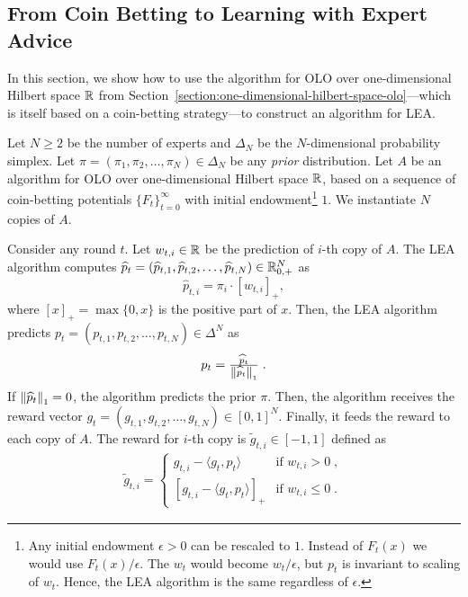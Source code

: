 \subsection{From Coin Betting to Learning with Expert Advice}
\label{section:reduction-experts}

In this section, we show how to use the algorithm for OLO over one-dimensional
Hilbert space $\mathbb{R}$ from
Section~\ref{section:one-dimensional-hilbert-space-olo}---which is itself based
on a coin-betting strategy---to construct an algorithm for \ac{LEA}.

Let $N \ge 2$ be the number of experts and $\Delta_N$ be the $N$-dimensional
probability simplex. Let $\pi = (\pi_1, \pi_2, \dots, \pi_N) \in \Delta_N$ be
any \emph{prior} distribution. Let $A$ be an algorithm for OLO over
one-dimensional Hilbert space $\mathbb{R}$, based on a sequence of coin-betting
potentials $\{F_t\}_{t=0}^\infty$ with initial endowment\footnote{Any initial
endowment $\epsilon > 0$ can be rescaled to $1$. Instead of $F_t(x)$ we would
use $F_t(x)/\epsilon$. The $w_t$ would become $w_t/\epsilon$, but $p_t$ is
invariant to scaling of $w_t$. Hence, the LEA algorithm is the same regardless
of $\epsilon$.} $1$. We instantiate $N$ copies of $A$.

Consider any round $t$. Let $w_{t,i} \in \mathbb{R}$ be the prediction of $i$-th copy of
$A$. The LEA algorithm computes $\widehat p_t = (\widehat p_{t,1}, \widehat
p_{t,2}, \dots, \widehat p_{t,N}) \in \mathbb{R}_{0,+}^N$ as
\begin{equation}
\label{eq:phat}
\widehat p_{t,i} = \pi_i \cdot [w_{t,i}]_+,
\end{equation}
where $[x]_+ = \max\{0,x\}$ is the positive part of $x$. Then, the LEA
algorithm predicts $p_t = (p_{t,1}, p_{t,2}, \dots, p_{t,N}) \in \Delta^N$ as
\begin{equation}
\label{eq:preds_experts}
p_t = \tfrac{\widehat p_t}{\left\|{\widehat p_t}\right\|_1} \; .
\end{equation}
If $\left\|{\widehat p_t}\right\|_1 = 0$, the algorithm predicts the prior $\pi$.
Then, the algorithm receives the reward vector
$g_t = (g_{t,1}, g_{t,2}, \dots, g_{t,N}) \in [0,1]^N$. Finally, it
feeds the reward to each copy of $A$. The reward for $i$-th copy is $\widetilde g_{t,i} \in
[-1,1]$ defined as
\begin{align}
\label{eq:gradients_experts_reduction}
\widetilde g_{t,i} =
\begin{cases}
g_{t,i} - \langle g_t, p_t \rangle & \text{if } w_{t,i} > 0 \; , \\
\left[g_{t,i} - \langle g_t, p_t \rangle \right]_+ & \text{if } w_{t,i} \le 0 \; .
\end{cases}
\end{align}

